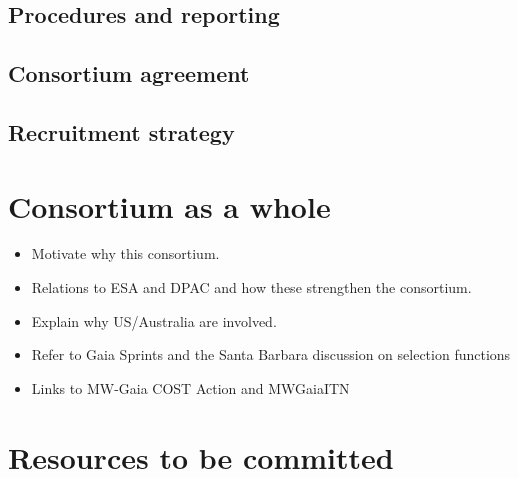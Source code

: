\subsection{Procedures and reporting}
\label{sec:procedures}

\subsection{Consortium agreement}
\label{sec:cons_agreement}

\subsection{Recruitment strategy}
\label{sec:recruit}


\makemilestoneslist


\makerisklist

\section{Consortium as a whole}
\label{sec:consortium}

\begin{itemize}
    \item Motivate why this consortium.
    \item Relations to ESA and DPAC and how these strengthen the consortium.
    \item Explain why US/Australia are involved.
    \item Refer to Gaia Sprints and the Santa Barbara discussion on selection functions
    \item Links to MW-Gaia COST Action and MWGaiaITN
\end{itemize}

\section{Resources to be committed}
\label{sec:resources}

\makesummaryofefforttable


\makecoststable


